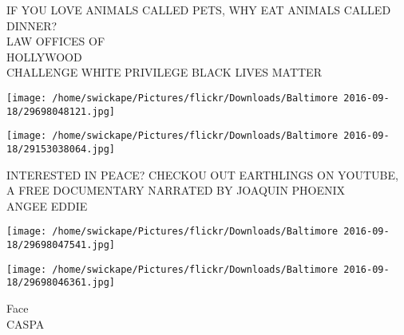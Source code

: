 \documentclass[10pt,letterpaper]{article}
\begin{document}
IF YOU LOVE ANIMALS CALLED PETS, WHY EAT ANIMALS CALLED DINNER?\\
LAW OFFICES OF\\
HOLLYWOOD\\
CHALLENGE WHITE PRIVILEGE BLACK LIVES MATTER
\pagebreak

\texttt{[image: /home/swickape/Pictures/flickr/Downloads/Baltimore 2016-09-18/29698048121.jpg]}

\vspace{0.25in}
\texttt{[image: /home/swickape/Pictures/flickr/Downloads/Baltimore 2016-09-18/29153038064.jpg]}

INTERESTED IN PEACE?  CHECKOU OUT EARTHLINGS ON YOUTUBE, A FREE DOCUMENTARY NARRATED BY JOAQUIN PHOENIX\\
ANGEE EDDIE
\pagebreak

\texttt{[image: /home/swickape/Pictures/flickr/Downloads/Baltimore 2016-09-18/29698047541.jpg]}

\vspace{0.25in}
\texttt{[image: /home/swickape/Pictures/flickr/Downloads/Baltimore 2016-09-18/29698046361.jpg]}

Face\\
CASPA
\pagebreak
\end{document}
